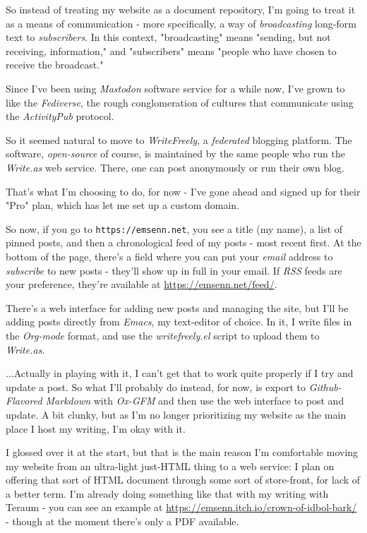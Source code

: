 \documentclass[11pt]{article}
\begin{document}
So instead of treating my website as a document repository, I'm going
to treat it as a means of communication - more specifically, a way of
\emph{broadcasting} long-form text to \emph{subscribers}. In this context,
"broadcasting" means "sending, but not receiving, information," and
"subscribers" means "people who have chosen to receive the broadcast."

Since I've been using \emph{Mastodon} software service for a while now,
I've grown to like the \emph{Fediverse}, the rough conglomeration of
cultures that communicate using the \emph{ActivityPub} protocol.

So it seemed natural to move to \emph{WriteFreely}, a \emph{federated} blogging
platform. The software, \emph{open-source} of course, is maintained by the
same people who run the \emph{Write.as} web service. There, one can post
anonymously or run their own blog.

That's what I'm choosing to do, for now - I've gone ahead and signed
up for their "Pro" plan, which has let me set up a custom domain.

So now, if you go to \texttt{https://emsenn.net}, you see a title (my name),
a list of pinned posts, and then a chronological feed of my posts -
most recent first. At the bottom of the page, there's a field where
you can put your \emph{email} address to \emph{subscribe} to new posts - they'll
show up in full in your email. If \emph{RSS} feeds are your preference,
they're available at \href{https://emsenn.net/feed/}{https://emsenn.net/feed/}.

There's a web interface for adding new posts and managing the site,
but I'll be adding posts directly from \emph{Emacs}, my text-editor of
choice. In it, I write files in the \emph{Org-mode} format, and use the
\emph{writefreely.el} script to upload them to \emph{Write.as}.

...Actually in playing with it, I can't get that to work quite
properly if I try and update a post. So what I'll probably do instead,
for now, is export to \emph{Github-Flavored Markdown} with \emph{Ox-GFM} and
then use the web interface to post and update. A bit clunky, but as
I'm no longer prioritizing my website as the main place I host my
writing, I'm okay with it.

I glossed over it at the start, but that is the main reason I'm
comfortable moving my website from an ultra-light just-HTML thing to a
web service: I plan on offering that sort of HTML document through
some sort of store-front, for lack of a better term. I'm already doing
something like that with my writing with Teraum - you can see an
example at \href{https://emsenn.itch.io/crown-of-idbol-bark/}{https://emsenn.itch.io/crown-of-idbol-bark/} - though at the
moment there's only a PDF available.
\end{document}
